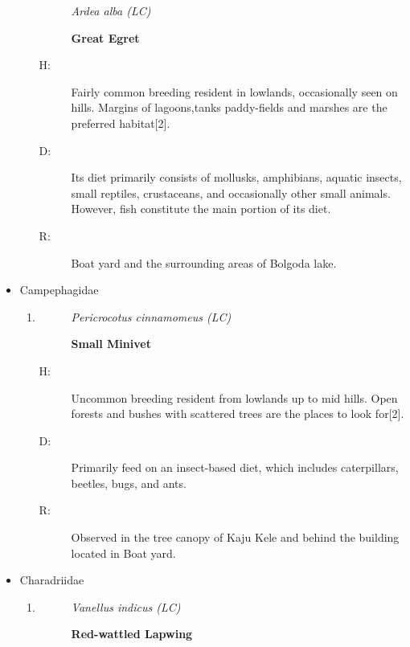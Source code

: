\begin{itemize}
\begin{enumerate}
\begin{description}%
\item[]%
\textit{Ardea alba (LC)}%
\item[]%
\textbf{Great Egret}%
\end{description}%
\begin{description}%
\item[H: ]%
Fairly common breeding resident in lowlands, occasionally seen on hills. Margins of lagoons,tanks paddy-fields and marshes are the preferred habitat{[}2{]}.%
\item[D: ]%
Its diet primarily consists of mollusks, amphibians, aquatic insects, small reptiles, crustaceans, and occasionally other small animals. However, fish constitute the main portion of its diet.%
\item[R: ]%
Boat yard and the surrounding areas of Bolgoda lake.%
\end{description}%
\end{enumerate}%
\item%
Campephagidae%
\begin{enumerate}%
\item%
\begin{description}%
\item[]%
\textit{Pericrocotus cinnamomeus (LC)}%
\item[]%
\textbf{Small Minivet}%
\end{description}%
\begin{description}%
\item[H: ]%
Uncommon breeding resident from lowlands up to mid hills. Open forests and bushes with scattered trees are the places to look for{[}2{]}.%
\item[D: ]%
Primarily feed on an insect{-}based diet, which includes caterpillars, beetles, bugs, and ants.%
\item[R: ]%
Observed in the tree canopy of Kaju Kele and behind the building located in Boat yard.%
\end{description}%
\end{enumerate}%
\item%
Charadriidae%
\begin{enumerate}%
\item%
\begin{description}%
\item[]%
\textit{Vanellus indicus (LC)}%
\item[]%
\textbf{Red{-}wattled Lapwing}%
\end{description}%
\begin{description}%

\end{description}
\end{enumerate}
\end{itemize}
